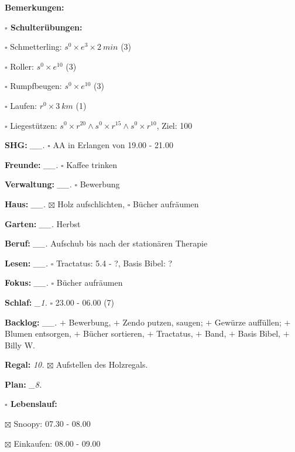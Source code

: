 \documentclass[10pt,a4paper]{article}
\newcommand\prop[1] {{\color {alizarin} {\bf #1}}}             %
\newcommand\opti[1] {{\color {amethyst} {\bf #1}}}             %
\newcommand\mand[1] {{\color {burntorange} {\bf #1}}}          %
\newcommand\topspace{\vskip -15pt \hskip 20pt}
\newcommand\bottomspace{\vskip 4pt}
\newcommand\n[1] { {\sl #1.} \hskip 5pt }
\begin{document}
\begin{mdframed}[style=daystyle]
\begin{labeling}{{\mand {Bemerkungen:}}}
\begin{minipage}{0.75\textwidth}
\begin{labeling}{\prop {$\square$ {Schulterübungen:}}}
      \item[$\square$ Schmetterling:]   $s^0 \times e^3 \times 2\ min$ (3)
      \item[$\square$ Roller:]          $s^0 \times e^{10}$ (3)
      \item[$\square$ Rumpfbeugen:]     $s^0 \times e^{10}$ (3)
      \item[$\square$ Laufen:]          $r^0 \times 3\ km$ (1)
      \item[$\square$ Liegestützen:]    $s^0 \times r^{20} \land s^0 \times r^{15} \land s^0 \times r^{10}$, Ziel: 100
      \end{labeling}
    \end{minipage}
    \bottomspace        
  \item[{\mand {SHG:}}]          \n{\_\_} $\square$ AA in Erlangen von 19.00 - 21.00
  \item[{\mand {Freunde:}}]      \n{\_\_} $\square$ Kaffee trinken
  \item[{\mand {Verwaltung:}}]   \n{\_\_} $\square$ Bewerbung
  \item[{\mand {Haus:}}]         \n{\_\_} $\boxtimes$ Holz aufschlichten, $\square$ Bücher aufräumen
  \item[{\mand {Garten:}}]       \n{\_\_} Herbst
  \item[{\mand {Beruf:}}]        \n{\_\_} Aufschub bis nach der stationären Therapie
  \item[{\mand {Lesen:}}]        \n{\_\_} $\square$ Tractatus: 5.4 - ?, Basis Bibel: ?
  \item[{\mand {Fokus:}}]        \n{\_\_} $\square$ Bücher aufräumen
  \item[{\mand {Schlaf:}}]        \n{\_1} $\square$ 23.00 - 06.00 (7)
  \item[{\mand {Backlog:}}]      \n{\_\_} 
    $+$ Bewerbung,
    $+$ Zendo putzen, saugen; $+$ Gewürze auffüllen; $+$ Blumen entsorgen, $+$ Bücher sortieren,
    $+$ Tractatus, $+$ Band, $+$ Basis Bibel, $+$ Billy W.
  \item[{\opti {Regal:}}]          \n{10} $\boxtimes$ Aufstellen des Holzregals.
  \item[{\mand {Plan:}}]          \n{\_8}
    \topspace
    \begin{minipage}{0.75\textwidth}  
      \begin{labeling}{\prop {$\square$ {Lebenslauf:}}} 
        \setlength\itemsep{-3pt}
      \item[$\boxtimes$ Snoopy:]     07.30 - 08.00
      \item[$\boxtimes$ Einkaufen:]  08.00 - 09.00

\end{labeling}
\end{minipage}
\end{labeling}
\end{mdframed}
\end{document}
